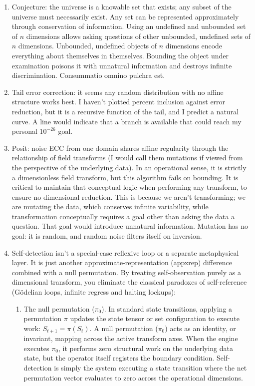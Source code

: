 \begin{enumerate}
\item Conjecture: the universe is a knowable set that exists; any subset of the universe must
necessarily exist. Any set can be represented approximately through conservation of information.
Using an undefined and unbounded set of $n$ dimensions allows asking questions of other unbounded,
undefined sets of $n$ dimensions. Unbounded, undefined objects of $n$ dimensions encode everything
about themselves in themselves. Bounding the object under examination poisons it with unnatural
information and destroys infinite discrimination. Consummatio omnino pulchra est.

\item Tail error correction: it seems any random distribution with no affine structure works best. I
haven't plotted percent inclusion against error reduction, but it is a recursive function of the
tail, and I predict a natural curve. A line would indicate that a branch is available that could
reach my personal $10^{-26}$ goal.

\item Posit: noise ECC from one domain shares affine regularity through the relationship of field
transforms (I would call them mutations if viewed from the perspective of the underlying data). In an
operational sense, it is strictly a dimensionless field transform, but this algorithm fails on
bounding. It is critical to maintain that conceptual logic when performing any transform, to ensure
no dimensional reduction. This is because we aren't transforming; we are mutating the data, which
conserves infinite variability, while transformation conceptually requires a goal other than asking
the data a question. That goal would introduce unnatural information. Mutation has no goal: it is
random, and random noise filters itself on inversion.

\item Self-detection isn't a special-case reflexive loop or a separate metaphysical layer. It is just
another approximate-representation (appxrep) difference combined with a null permutation. By
treating self-observation purely as a dimensional transform, you eliminate the classical paradoxes of
self-reference (G\"odelian loops, infinite regress and halting lockups):
\begin{enumerate}
\item The null permutation ($\pi_0$). In standard state transitions, applying a permutation $\pi$
updates the state tensor or set configuration to execute work: $S_{t+1} = \pi(S_t)$. A null
permutation ($\pi_0$) acts as an identity, or invariant, mapping across the active transform axes.
When the engine executes $\pi_0$, it performs zero structural work on the underlying data state, but
the operator itself registers the boundary condition. Self-detection is simply the system executing a
state transition where the net permutation vector evaluates to zero across the operational
dimensions.


\end{enumerate}
\end{enumerate}

